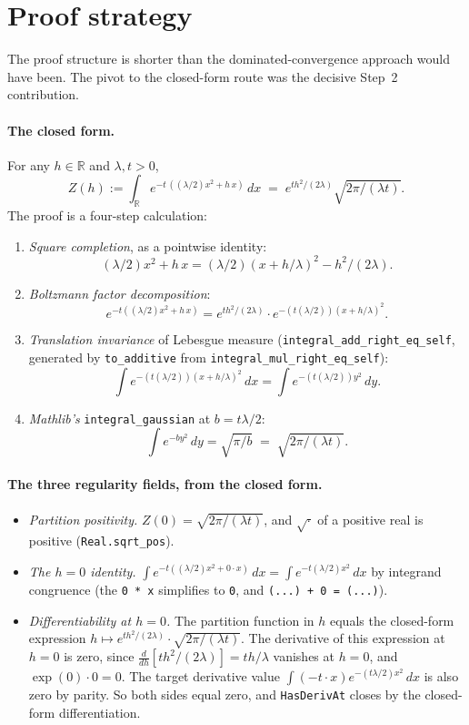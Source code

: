 \documentclass[11pt]{article}
\begin{document}
\section{Proof strategy}

The proof structure is shorter than the dominated-convergence
approach would have been. The pivot to the closed-form route was
the decisive Step~2 contribution.

\paragraph{The closed form.} For any $h \in \mathbb{R}$ and
$\lambda, t > 0$,
\[
  Z(h) := \int_{\mathbb{R}} e^{-t\,((\lambda/2)x^2 + h\,x)}\,dx
  \;=\; e^{t h^2 / (2\lambda)} \sqrt{2\pi / (\lambda t)}.
\]
The proof is a four-step calculation:
\begin{enumerate}
\item \emph{Square completion}, as a pointwise identity:
\[
  (\lambda/2) x^2 + h\,x
  = (\lambda/2) (x + h/\lambda)^2 - h^2 / (2\lambda).
\]
\item \emph{Boltzmann factor decomposition}:
\[
  e^{-t((\lambda/2)x^2 + h\,x)}
  = e^{t h^2 / (2\lambda)} \cdot e^{-(t (\lambda/2)) (x + h/\lambda)^2}.
\]
\item \emph{Translation invariance} of Lebesgue measure
(\texttt{integral\_add\_right\_eq\_self}, generated by
\texttt{to\_additive} from \texttt{integral\_mul\_right\_eq\_self}):
\[
  \int e^{-(t (\lambda/2)) (x + h/\lambda)^2}\,dx
  = \int e^{-(t (\lambda/2)) y^2}\,dy.
\]
\item \emph{Mathlib's} \texttt{integral\_gaussian} at $b = t\lambda/2$:
\[
  \int e^{-b y^2}\,dy = \sqrt{\pi/b}
  \;=\; \sqrt{2\pi/(\lambda t)}.
\]
\end{enumerate}

\paragraph{The three regularity fields, from the closed form.}
\begin{itemize}
\item \emph{Partition positivity.} $Z(0) = \sqrt{2\pi/(\lambda t)}$, and
$\sqrt{\cdot}$ of a positive real is positive (\texttt{Real.sqrt\_pos}).

\item \emph{The $h = 0$ identity.}
$\int e^{-t((\lambda/2)x^2 + 0\cdot x)}\,dx
= \int e^{-t(\lambda/2)x^2}\,dx$ by integrand congruence (the
\texttt{0~*~x} simplifies to \texttt{0}, and \texttt{(...)~+~0~=~(...)}).

\item \emph{Differentiability at $h = 0$.} The partition function in
$h$ equals the closed-form expression
$h \mapsto e^{t h^2/(2\lambda)} \cdot \sqrt{2\pi/(\lambda t)}$. The
derivative of this expression at $h = 0$ is zero, since
$\frac{d}{dh}[t h^2/(2\lambda)] = t h / \lambda$ vanishes at $h = 0$,
and $\exp(0) \cdot 0 = 0$. The target derivative value
$\int (-t \cdot x) e^{-(t \lambda/2) x^2}\,dx$ is also zero by
parity. So both sides equal zero, and \texttt{HasDerivAt} closes by
the closed-form differentiation.
\end{itemize}
\end{document}
